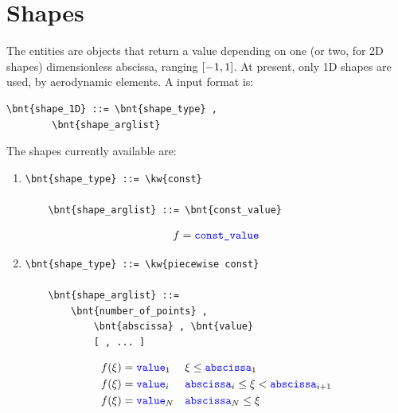 \section{Shapes}
The  entities are objects that return a value depending on one
(or two, for 2D shapes) dimensionless abscissa, ranging $ \left[ -1,1 \right] $.
At present, only 1D shapes are used, by aerodynamic elements.
A  input format is:
\begin{Verbatim}[commandchars=\\\{\}]
    \bnt{shape_1D} ::= \bnt{shape_type} ,
        \bnt{shape_arglist}
\end{Verbatim}
The shapes currently available are:
\begin{enumerate}
    \item {}
\begin{Verbatim}[commandchars=\\\{\}]
    \bnt{shape_type} ::= \kw{const}

    \bnt{shape_arglist} ::= \bnt{const_value}
\end{Verbatim}
\begin{align}
	f = \textcolor{blue}{\texttt{const\_value}}
\end{align}

    \item {}
\begin{Verbatim}[commandchars=\\\{\}]
    \bnt{shape_type} ::= \kw{piecewise const}

    \bnt{shape_arglist} ::=
        \bnt{number_of_points} , 
            \bnt{abscissa} , \bnt{value}
            [ , ... ]
\end{Verbatim}
\begin{subequations}
\begin{align}
	f(\xi) &= \textcolor{blue}{\texttt{value}}_1	&& \xi \le \textcolor{blue}{\texttt{abscissa}}_1
	\\
	f(\xi) &= \textcolor{blue}{\texttt{value}}_i	&& \textcolor{blue}{\texttt{abscissa}}_i \le \xi < \textcolor{blue}{\texttt{abscissa}}_{i+1}
	\\
	f(\xi) &= \textcolor{blue}{\texttt{value}}_N	&& \textcolor{blue}{\texttt{abscissa}}_N \le \xi
\end{align}
\end{subequations}


\end{enumerate}
